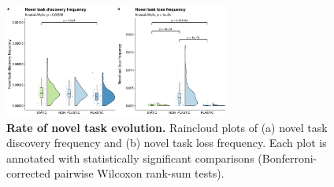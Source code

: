 \begin{figure}[h!]
    \centering
    \includegraphics[width=0.66\textwidth]{media/complex-traits-pace-panel.pdf}
    \caption{\small
    \textbf{Rate of novel task evolution.}
    Raincloud plots of 
    (a) novel task discovery frequency
    and (b) novel task loss frequency.
    Each plot is annotated with statistically significant comparisons (Bonferroni-corrected pairwise Wilcoxon rank-sum tests).
    }
    \label{fig:complex-traits-rate}
\end{figure}